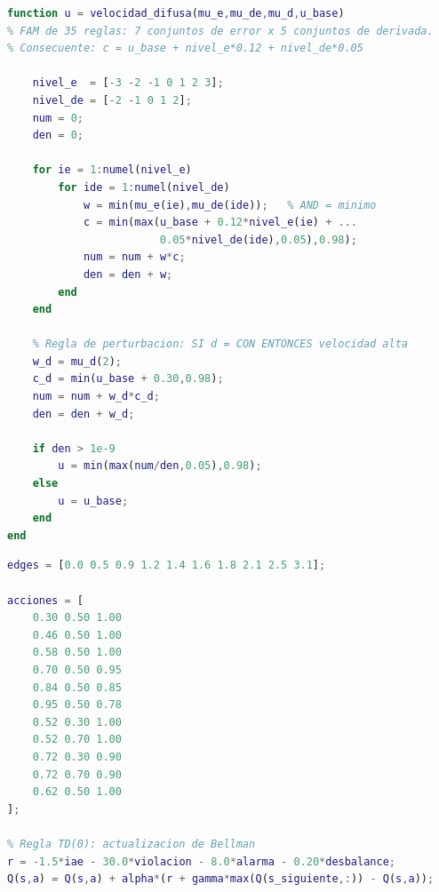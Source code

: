 \begin{lstlisting}[language=Matlab, caption={Controlador difuso: inferencia AND-mínimo y defuzzificación por singletons.}]
function u = velocidad_difusa(mu_e,mu_de,mu_d,u_base)
% FAM de 35 reglas: 7 conjuntos de error x 5 conjuntos de derivada.
% Consecuente: c = u_base + nivel_e*0.12 + nivel_de*0.05

    nivel_e  = [-3 -2 -1 0 1 2 3];
    nivel_de = [-2 -1 0 1 2];
    num = 0;
    den = 0;

    for ie = 1:numel(nivel_e)
        for ide = 1:numel(nivel_de)
            w = min(mu_e(ie),mu_de(ide));   % AND = minimo
            c = min(max(u_base + 0.12*nivel_e(ie) + ...
                        0.05*nivel_de(ide),0.05),0.98);
            num = num + w*c;
            den = den + w;
        end
    end

    % Regla de perturbacion: SI d = CON ENTONCES velocidad alta
    w_d = mu_d(2);
    c_d = min(u_base + 0.30,0.98);
    num = num + w_d*c_d;
    den = den + w_d;

    if den > 1e-9
        u = min(max(num/den,0.05),0.98);
    else
        u = u_base;
    end
end
\end{lstlisting}

\begin{lstlisting}[language=Matlab, caption={Actualización TD(0) del Q-Learning y codificación de estado para la coordinación de esteras.}]
% Estado: (nivel_E1_bin, nivel_E2_bin, perturbacion_bin) -> 9x9x2 = 162 estados.
edges = [0.0 0.5 0.9 1.2 1.4 1.6 1.8 2.1 2.5 3.1];

acciones = [
    0.30 0.50 1.00
    0.46 0.50 1.00
    0.58 0.50 1.00
    0.70 0.50 0.95
    0.84 0.50 0.85
    0.95 0.50 0.78
    0.52 0.30 1.00
    0.52 0.70 1.00
    0.72 0.30 0.90
    0.72 0.70 0.90
    0.62 0.50 1.00
];

% Regla TD(0): actualizacion de Bellman
r = -1.5*iae - 30.0*violacion - 8.0*alarma - 0.20*desbalance;
Q(s,a) = Q(s,a) + alpha*(r + gamma*max(Q(s_siguiente,:)) - Q(s,a));
\end{lstlisting}

